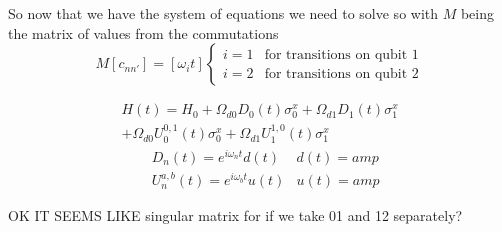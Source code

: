 \documentclass[12pt]{article}
\begin{document}
So now that we have the system of equations we need to solve
so with $M$ being the matrix of values from the commutations
\begin{equation}
    M[c_{nn'}] = [\omega_i t]
    \begin{cases}
        i = 1 & \text{for transitions on qubit 1}\\
        i = 2 & \text{for transitions on qubit 2}
    \end{cases}
\end{equation}

\begin{equation}
    \begin{split}
    H(t) = H_0 + \Omega_{d0} D_0(t) \sigma_0^x + \Omega_{d1} D_1(t) \sigma_1^x\\
    + \Omega_{d0} U_0^{0,1}(t) \sigma_0^x + \Omega_{d1} U_1^{1,0}(t) \sigma_1^x 
    \end{split}
\end{equation}
\begin{align}
    & D_n(t) = e^{i \omega_n t} d(t) & d(t) = amp\\
    & U_n^{a,b}(t) = e^{i \omega_b t} u(t) & u(t) = amp
\end{align}

OK IT SEEMS LIKE singular matrix for if we take 01 and 12 separately?
\end{document}
